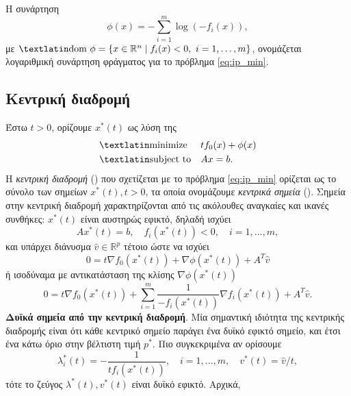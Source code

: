 Η συνάρτηση
\begin{equation*}
    \phi(x) = - \sum_{i=1}^m \log{(-f_i(x))},
\end{equation*}
με \( \text{\tl{dom}}\ \phi = \{ x \in \mathbb{R}^n \mid f_i (x) < 0,\ i= 1,
\dots, m \} \), ονομάζεται λογαριθμική συνάρτηση φράγματος για το πρόβλημα
\eqref{eq:ip_min}.

\subsection{Κεντρική διαδρομή}
Έστω \( t > 0 \), ορίζουμε \( x^*(t) \) ως λύση της
\begin{equation*}
    \begin{aligned}
        & \text{\tl{minimize}}
        & & tf_0(x) + \phi(x) \\
        & \text{\tl{subject to}}
        & & Ax = b.
    \end{aligned}
\end{equation*}
Η \emph{κεντρική διαδρομή} () που σχετίζεται με το πρόβλημα
\eqref{eq:ip_min} ορίζεται ως το σύνολο των σημείων \( x^*(t), t > 0 \), τα
οποία ονομάζουμε \emph{κεντρικά σημεία} (). Σημεία στην
κεντρική διαδρομή χαρακτηρίζονται από τις ακόλουθες αναγκαίες και ικανές
συνθήκες: \( x^*(t) \) είναι αυστηρώς εφικτό, δηλαδή ισχύει
\begin{equation*}
    Ax^*(t) = b, \quad f_i(x^*(t)) < 0, \quad i = 1,\dots, m,
\end{equation*}
και υπάρχει διάνυσμα \( \hat{v} \in \mathbb{R}^p \) τέτοιο ώστε
να ισχύει
\begin{equation*}
    0 = t\nabla f_0 (x^*(t)) + \nabla \phi (x^*(t)) + A^T \hat{v}
\end{equation*}
ή ισοδύναμα με αντικατάσταση της κλίσης \( \nabla \phi (x^*(t)) \)
\begin{equation}\label{eq:ip_cpc}
    0 = t\nabla f_0 (x^*(t)) + \sum_{i = 1}^m \dfrac{1}{-f_i(x^*(t))} \nabla f_i
    (x^*(t)) + A^T \hat{v}.
\end{equation}
\textbf{Δυϊκά σημεία από την κεντρική διαδρομή}. Μία σημαντική ιδιότητα της
κεντρικής διαδρομής είναι ότι κάθε κεντρικό σημείο
παράγει ένα δυϊκό εφικτό σημείο, και έτσι ένα κάτω όριο στην βέλτιστη τιμή
\( p^* \). Πιο συγκεκριμένα αν ορίσουμε
\begin{equation}\label{eq:ip_dual_feas}
    \lambda_i^*(t) = - \dfrac{1}{t f_i(x^*(t))},\quad i = 1, \dots, m,
    \quad v^*(t) = \hat{v}/t,
\end{equation}
τότε το ζεύγος \( \lambda^*(t), v^*(t) \) είναι δυϊκό εφικτό. Αρχικά,
